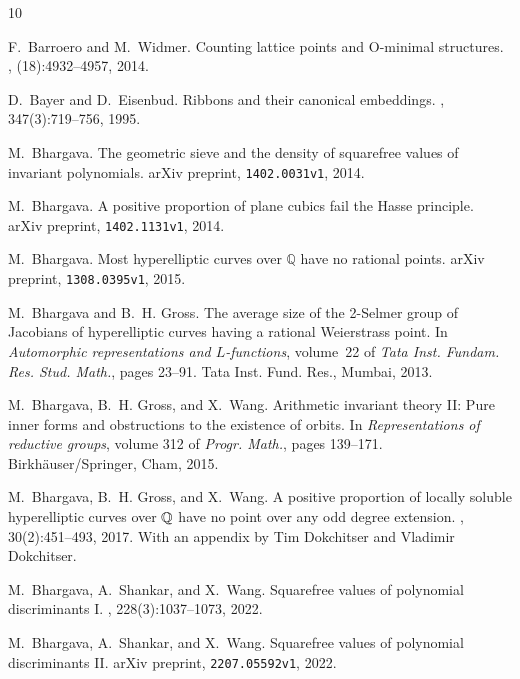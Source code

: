 \begin{thebibliography}{10}

F.~Barroero and M.~Widmer.
\newblock Counting lattice points and {O}-minimal structures.
, (18):4932--4957, 2014.

D.~Bayer and D.~Eisenbud.
\newblock Ribbons and their canonical embeddings.
, 347(3):719--756, 1995.

M.~Bhargava.
\newblock The geometric sieve and the density of squarefree values of invariant
  polynomials.
\newblock arXiv preprint, \texttt{1402.0031v1}, 2014.

M.~Bhargava.
\newblock A positive proportion of plane cubics fail the {H}asse principle.
\newblock arXiv preprint, \texttt{1402.1131v1}, 2014.

M.~Bhargava.
\newblock Most hyperelliptic curves over {$\mathbb{Q}$} have no rational
  points.
\newblock arXiv preprint, \texttt{1308.0395v1}, 2015.

M.~Bhargava and B.~H. Gross.
\newblock The average size of the 2-{S}elmer group of {J}acobians of
  hyperelliptic curves having a rational {W}eierstrass point.
\newblock In {\em Automorphic representations and {$L$}-functions}, volume~22
  of {\em Tata Inst. Fundam. Res. Stud. Math.}, pages 23--91. Tata Inst. Fund.
  Res., Mumbai, 2013.

M.~Bhargava, B.~H. Gross, and X.~Wang.
\newblock Arithmetic invariant theory {II}: {P}ure inner forms and obstructions
  to the existence of orbits.
\newblock In {\em Representations of reductive groups}, volume 312 of {\em
  Progr. Math.}, pages 139--171. Birkh\"{a}user/Springer, Cham, 2015.

M.~Bhargava, B.~H. Gross, and X.~Wang.
\newblock A positive proportion of locally soluble hyperelliptic curves over
  {$\Bbb Q$} have no point over any odd degree extension.
, 30(2):451--493, 2017.
\newblock With an appendix by Tim Dokchitser and Vladimir Dokchitser.

M.~Bhargava, A.~Shankar, and X.~Wang.
\newblock Squarefree values of polynomial discriminants {I}.
, 228(3):1037--1073, 2022.

M.~Bhargava, A.~Shankar, and X.~Wang.
\newblock Squarefree values of polynomial discriminants {II}.
\newblock arXiv preprint, \texttt{2207.05592v1}, 2022.


\end{thebibliography}
